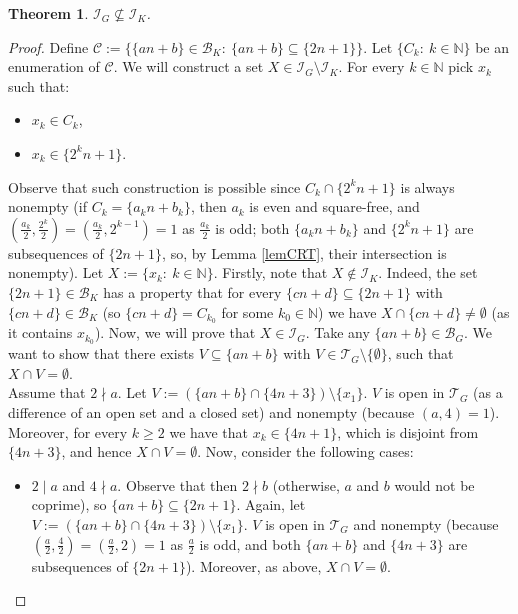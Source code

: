 \documentclass{amsart}
\newtheorem{thm}{Theorem}[section]
\theoremstyle{definition}
\theoremstyle{definition}
\newcommand{\N}{{\mathbb N}}
\newcommand{\I}{\mathcal I}
\newcommand{\T}{\mathcal{T}}
\newcommand{\B}{\mathcal{B}}
\begin{document}
\begin{thm}
$\I_G \not\subseteq \I_K$.
\end{thm}	   
\begin{proof}
Define $\mathcal{C} := \{\{an+b\}\in \B_K :\ \{an+b\}\subseteq \{2n+1\}\}$. Let $\{C_k :\ k\in\N\}$ be an enumeration of $\mathcal{C}$.
We will construct a set $X \in \I_G \setminus \I_K$. For every $k\in\N$ pick $x_k$ such that:
\begin{itemize}
	\item $x_k\in C_k$,
	\item $x_k\in \{2^k n+1\}$.
\end{itemize}
Observe that such construction is possible since $C_k \cap \{2^k n+1\}$ is always nonempty (if $C_k = \{a_k n+b_k\}$, then $a_k$ is even and square-free, and $\left(\frac{a_k}{2},\frac{2^k}{2}\right)=\left(\frac{a_k}{2},2^{k-1}\right)=1$ as $\frac{a_k}{2}$ is odd; both $\{a_k n+b_k\}$ and $\{2^k n+1\}$ are subsequences of $\{2n+1\}$, so, by 
Lemma \ref{lemCRT}, their intersection is nonempty). Let $X := \{x_k :\ k\in\N\}$.
Firstly, note that $X \notin \I_K$. Indeed, the set $\{2n+1\}\in\B_K$ has a property that for every $\{cn+d\}\subseteq \{2n+1\}$ with $\{cn+d\}\in \B_K$ (so $\{cn+d\}=C_{k_0}$ for some $k_0\in\N$) we have $X\cap \{cn+d\} \neq \emptyset$ (as it contains $x_{k_0}$).
Now, we will prove that $X \in \I_G$. Take any $\{an+b\}\in\B_G$. We want to show that there exists $V\subseteq \{an+b\}$ with $V\in \T_G\setminus\{\emptyset\}$, such that $X\cap V = \emptyset$. \\
Assume that $2\nmid a$. Let $V := (\{an+b\} \cap \{4n+3\})\setminus\{x_1\}$. $V$ is open in $\T_G$ (as a difference of an open set and a closed set) and nonempty (because $(a,4)=1$). Moreover, for every $k\geq 2$ we have that $x_k\in \{4n+1\}$, which is disjoint from $\{4n+3\}$, and hence $X\cap V = \emptyset$.
Now, consider the following cases:
\begin{itemize}
 \item $2\mid a$ and $4\nmid a$. Observe that then $2 \nmid b$ (otherwise, $a$ and $b$ would not be coprime), so $\{an+b\}\subseteq \{2n+1\}$. Again, let $V := (\{an+b\} \cap \{4n+3\})\setminus\{x_1\}$. $V$ is open in $\T_G$ and nonempty (because $\left(\frac{a}{2},\frac{4}{2}\right)=\left(\frac{a}{2},2\right)=1$ as $\frac{a}{2}$ is odd, and both $\{an+b\}$ and $\{4n+3\}$ are subsequences of $\{2n+1\}$). Moreover, as above, $X\cap V = \emptyset$.

\end{itemize}
\end{proof}
\end{document}
